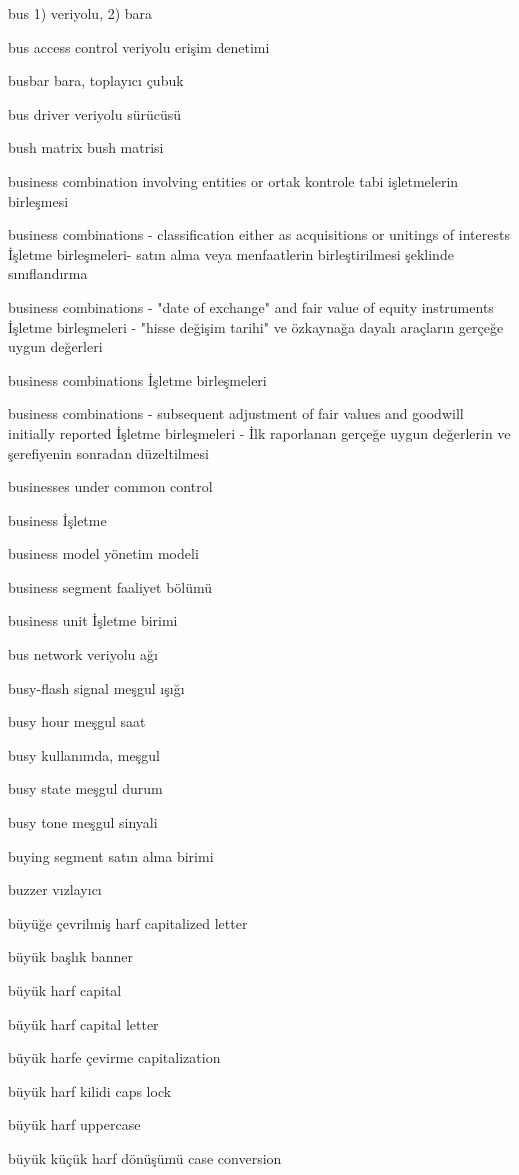 \documentclass[12pt,fleqn]{article}\usepackage{../../common}
\begin{document}
bus 1) veriyolu, 2) bara

bus access control veriyolu erişim denetimi

busbar bara, toplayıcı çubuk

bus driver veriyolu sürücüsü

bush matrix bush matrisi

business combination involving entities or ortak kontrole tabi işletmelerin birleşmesi

business combinations - classification either as acquisitions or unitings of interests İşletme birleşmeleri- satın alma veya menfaatlerin birleştirilmesi şeklinde sınıflandırma

business combinations - "date of exchange" and fair value of equity instruments İşletme birleşmeleri - "hisse değişim tarihi" ve özkaynağa dayalı araçların gerçeğe uygun değerleri

business combinations İşletme birleşmeleri

business combinations - subsequent adjustment of fair values and goodwill initially reported İşletme birleşmeleri - İlk raporlanan gerçeğe uygun değerlerin ve şerefiyenin sonradan düzeltilmesi

businesses under common control

business İşletme

business model yönetim modeli

business segment faaliyet bölümü

business unit İşletme birimi

bus network veriyolu ağı

busy-flash signal meşgul ışığı

busy hour meşgul saat

busy kullanımda, meşgul

busy state meşgul durum

busy tone meşgul sinyali

buying segment satın alma birimi

buzzer vızlayıcı

büyüğe çevrilmiş harf capitalized letter

büyük başlık banner

büyük harf capital

büyük harf capital letter

büyük harfe çevirme capitalization

büyük harf kilidi caps lock

büyük harf uppercase

büyük küçük harf dönüşümü case conversion
\end{document}
